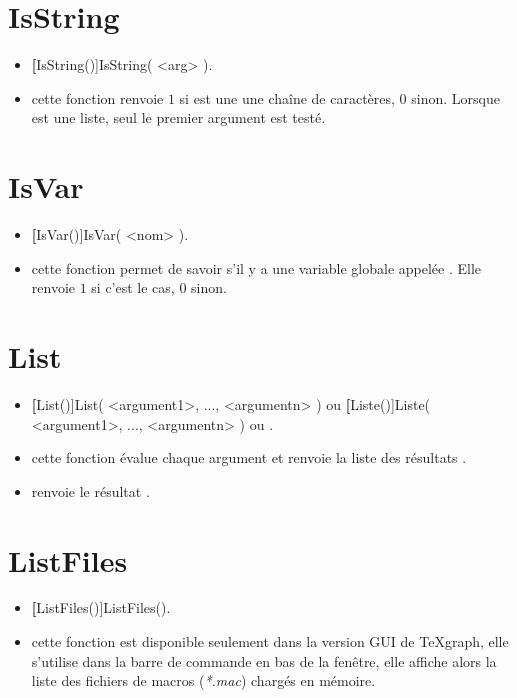 \section{IsString}\label{cmdIsString}

\begin{itemize}
 \item \util \textbf[IsString()]{IsString( <arg> )}.
 \item \desc cette fonction renvoie $1$ si  est une une chaîne de caractères, $0$ sinon. Lorsque  est une liste, seul le premier argument est testé.
\end{itemize}

\section{IsVar}\label{cmdIsVar}

\begin{itemize}
 \item \util \textbf[IsVar()]{IsVar( <nom> )}.
 \item \desc cette fonction permet de savoir s'il y a une variable globale appelée . Elle renvoie $1$ si c'est le cas, $0$ sinon.
\end{itemize}

\section{List}\label{cmdListe}

\begin{itemize}
 \item \util \textbf[List()]{List( <argument1>, ..., <argumentn> )} ou \textbf[Liste()]{Liste( <argument1>, ..., <argumentn> )} ou .
 \item \desc cette fonction évalue chaque argument et renvoie la liste des résultats .
 \item \exem {} renvoie le résultat \res{[1,1.107149,0.739085]}. 
\end{itemize}

\section{ListFiles}\label{cmdListFiles}

\begin{itemize}
 \item \util \textbf[ListFiles()]{ListFiles()}.
 \item \desc cette fonction est disponible seulement dans la version GUI de TeXgraph, elle s'utilise dans la barre de commande en bas de la fenêtre, elle affiche alors la liste des fichiers de macros (\textit{*.mac}) chargés en mémoire.
\end{itemize}

